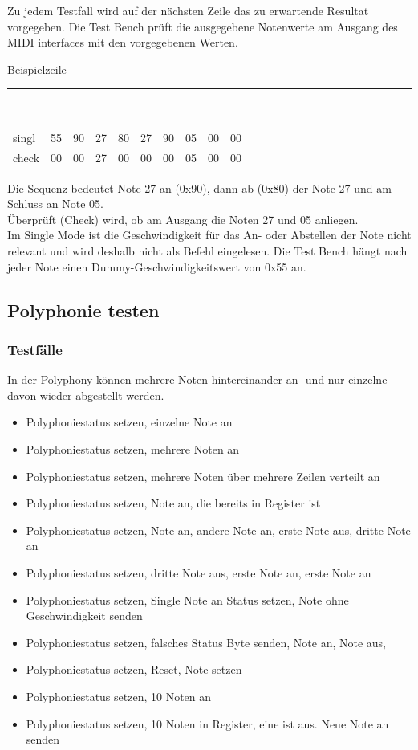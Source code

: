 Zu jedem Testfall wird auf der nächsten Zeile das zu erwartende Resultat vorgegeben. Die Test Bench prüft die ausgegebene Notenwerte am Ausgang des MIDI interfaces mit den vorgegebenen Werten.

Beispielzeile\\
\rule{\textwidth}{0.4pt}\\
{
\renewcommand{\arraystretch}{1.0} %
\begin{tabular*}{\textwidth}{@{}@{\extracolsep{\fill}}*{10}{l}@{}} %
singl & 55 & 90 & 27 & 80 & 27 & 90 & 05 & 00 & 00\\
check & 00 & 00 & 27 & 00 & 00 & 00 & 05 & 00 & 00\\
\end{tabular*}
}

Die Sequenz bedeutet Note 27 an (0x90), dann ab (0x80) der Note 27 und am Schluss an Note 05. \\
Überprüft (Check) wird, ob am Ausgang die Noten 27 und 05 anliegen.\\
Im Single Mode ist die Geschwindigkeit für das An- oder Abstellen der Note nicht relevant und wird deshalb nicht als Befehl eingelesen. Die Test Bench hängt nach jeder Note einen Dummy-Geschwindigkeitswert von 0x55 an.

\subsection{Polyphonie testen }\label{polyphonitest}

\subsubsection{Testfälle}

In der Polyphony können mehrere Noten hintereinander an- und nur einzelne davon wieder abgestellt werden.

\begin{itemize}
\item Polyphoniestatus setzen, einzelne Note an
\item Polyphoniestatus setzen, mehrere Noten an
\item Polyphoniestatus setzen, mehrere Noten über mehrere Zeilen verteilt an
\item Polyphoniestatus setzen, Note an, die bereits in Register ist
\item Polyphoniestatus setzen, Note an, andere Note an, erste Note aus, dritte Note an
\item Polyphoniestatus setzen, dritte Note aus, erste Note an, erste Note an
\item Polyphoniestatus setzen, Single Note an Status setzen, Note ohne Geschwindigkeit senden
\item Polyphoniestatus setzen, falsches Status Byte senden, Note an, Note aus,
\item Polyphoniestatus setzen, Reset, Note setzen
\item Polyphoniestatus setzen, 10 Noten an
\item Polyphoniestatus setzen, 10 Noten in Register, eine ist aus. Neue Note an senden
\end{itemize}

